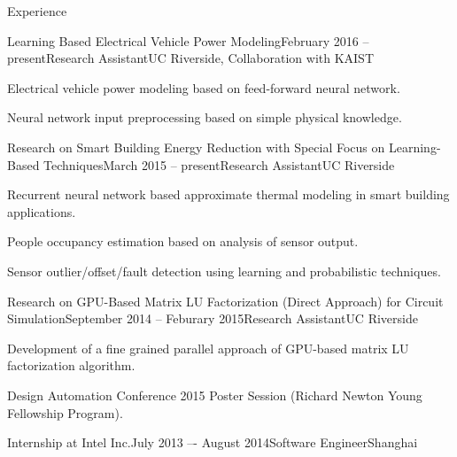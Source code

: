 \documentclass{resume} %
\begin{document}
\begin{rSection}{Experience}

    \begin{rSubsection}{Learning Based Electrical Vehicle Power Modeling}{February 2016 -- present}{Research Assistant}{UC Riverside, Collaboration with KAIST}

    \item Electrical vehicle power modeling based on feed-forward neural
        network.

    \item Neural network input preprocessing based on simple physical
        knowledge.

    \end{rSubsection}

    \begin{rSubsection}{Research on Smart Building Energy Reduction with Special Focus on Learning-Based Techniques}{March 2015 -- present}{Research Assistant}{UC Riverside}

    \item Recurrent neural network based approximate thermal modeling in smart
        building applications.

    \item People occupancy estimation based on analysis of sensor output.

    \item Sensor outlier/offset/fault detection using learning and
        probabilistic techniques.

    \end{rSubsection}

    \begin{rSubsection}{Research on GPU-Based Matrix LU Factorization (Direct Approach) for Circuit Simulation}{September 2014 -- Feburary 2015}{Research Assistant}{UC Riverside}

    \item Development of a fine grained parallel approach of GPU-based matrix
        LU factorization algorithm.

    \item Design Automation Conference 2015 Poster Session (Richard Newton
        Young Fellowship Program).

    \end{rSubsection}


    \begin{rSubsection}{Internship at Intel Inc.}{July 2013 –- August 2014}{Software Engineer}{Shanghai}


\end{rSubsection}
\end{rSection}
\end{document}

